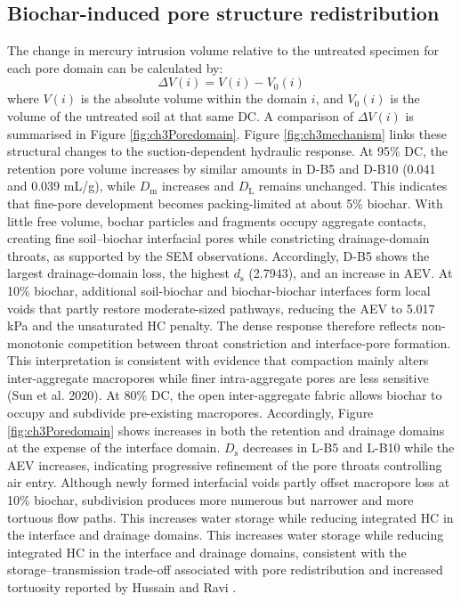 \subsection{Biochar-induced pore structure redistribution}
The change in mercury intrusion volume relative to the untreated specimen for each pore domain can be calculated by:
\begin{equation}
    \Delta V \left( i \right) = V \left( i \right) - V_0 \left( i \right)
\end{equation}
where $V(i)$ is the absolute volume within the domain $i$, and $V_0(i)$ is the volume of the untreated soil at that same \ac{DC}. A comparison of $\Delta V(i)$ is summarised in Figure \ref{fig:ch3Poredomain}. Figure \ref{fig:ch3mechanism} links these structural changes to the suction-dependent hydraulic response.  At 95\% \ac{DC}, the retention pore volume increases by similar amounts in D-B5 and D-B10 (0.041 and 0.039 mL/g), while $D_\mathrm{m}$ increases and $D_\mathrm{L}$ remains unchanged. This indicates that fine-pore development becomes packing-limited at about 5\% biochar. With little free volume, bochar particles and fragments occupy aggregate contacts, creating fine soil–biochar interfacial pores while constricting drainage-domain throats, as supported by the \ac{SEM} observations. Accordingly, D-B5 shows the largest drainage-domain loss, the highest $d_\mathrm{s}$ (2.7943), and an increase in \ac{AEV}. At 10\% biochar, additional soil-biochar and biochar-biochar interfaces form local voids that partly restore moderate-sized pathways, reducing the \ac{AEV} to 5.017 kPa and the unsaturated HC penalty. The dense response therefore reflects non-monotonic competition between throat constriction and interface-pore formation. This interpretation is consistent with evidence that compaction mainly alters inter-aggregate macropores while finer intra-aggregate pores are less sensitive (Sun et al. 2020). At 80\% \ac{DC}, the open inter-aggregate fabric allows biochar to occupy and subdivide pre-existing macropores. Accordingly, Figure \ref{fig:ch3Poredomain} shows increases in both the retention and drainage domains at the expense of the interface domain. $D_\mathrm{s}$ decreases in L-B5 and L-B10 while the \ac{AEV} increases, indicating progressive refinement of the pore throats controlling air entry. Although newly formed interfacial voids partly offset macropore loss at 10\% biochar, subdivision produces more numerous but narrower and more tortuous flow paths. This increases water storage while reducing integrated \ac{HC} in the interface and drainage domains. This increases water storage while reducing integrated \ac{HC} in the interface and drainage domains, consistent with the storage–transmission trade-off associated with pore redistribution and increased tortuosity reported by Hussain and Ravi \parencite*{hussainInvestigatingUnsaturatedHydraulic2021}.\par
